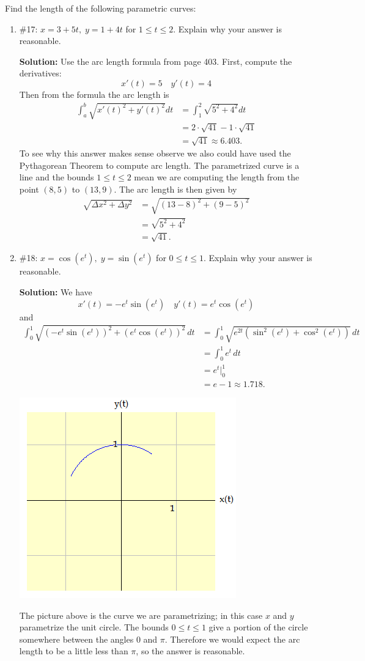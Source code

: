 \documentclass[11pt,letterpaper]{article}
\begin{document}
Find the length of the following parametric curves:
\begin{enumerate}
\item \#17: $x=3+5t,\;y=1+4t$ for $1\leq t\leq 2$.  Explain why your answer is reasonable. 

{\bf Solution:}  Use the arc length formula from page 403.  First, compute the derivatives:
$$x'(t)=5\quad y'(t)=4$$
Then from the formula the arc length is
\begin{align*}\int_a^b\sqrt{x'(t)^2+y'(t)^2}dt &= \int_1^2\sqrt{5^2+4^2}dt \\
&= 2\cdot\sqrt{41}-1\cdot\sqrt{41} \\
&= \sqrt{41} \approx 6.403. 
\end{align*}
To see why this answer makes sense observe we also could have used the Pythagorean Theorem to compute arc length.  The parametrized curve is a line and the bounds $1\leq t\leq 2$ mean we are computing the length from the point $(8,5)$ to $(13,9)$.  The arc length is then given by 
\begin{align*}
\sqrt{\Delta x^2+\Delta y^2} &=\sqrt{(13-8)^2+(9-5)^2} \\
&= \sqrt{5^2+4^2} \\
&=\sqrt{41}.
\end{align*}

\item \#18: $x=\cos{(e^t)},\;y=\sin{(e^t)}$ for $0\leq t\leq 1$.  Explain why your answer is reasonable.

{\bf Solution:} We have
$$x'(t)=-e^t\sin{(e^t)}\quad y'(t)=e^t\cos{(e^t)}$$
and
\begin{align*}
\int_0^1\sqrt{(-e^t\sin{(e^t)})^2+(e^t\cos{(e^t)})^2}\,dt &= \int_0^1\sqrt{e^{2t}(\sin^2{(e^t)}+\cos^2{(e^t)})}\,dt \\
&= \int_0^1e^t\,dt \\
&= e^t|_0^1 \\
&= e-1 \approx 1.718.
\end{align*}
\begin{center}
\includegraphics[width=.4\textwidth]{ch8ec.png}
\end{center}
The picture above is the curve we are parametrizing; in this case $x$ and $y$ parametrize the unit circle.  The bounds $0\leq t\leq 1$ give a portion of the circle somewhere between the angles $0$ and $\pi$.  Therefore we would expect the arc length to be a little less than $\pi$, so the answer is reasonable.


\end{enumerate}
\end{document}
